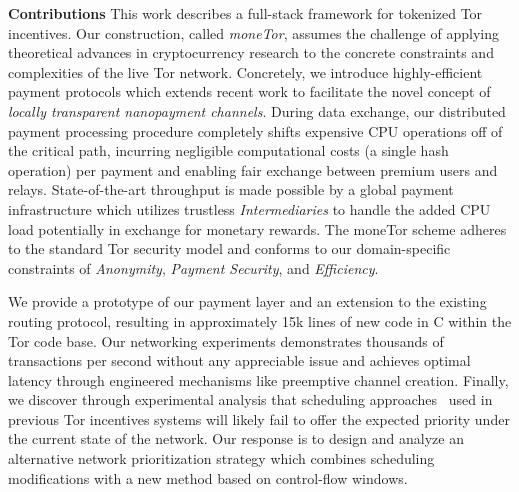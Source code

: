\label{sec:Contributions}
\textbf{Contributions} This work describes a full-stack framework for tokenized
Tor incentives. Our construction, called \emph{moneTor}, assumes the challenge
of applying theoretical advances in cryptocurrency research to the concrete
constraints and complexities of the live Tor network. Concretely, we introduce
highly-efficient payment protocols which extends recent work to facilitate the
novel concept of \emph{locally transparent nanopayment channels}. During data
exchange, our distributed payment processing procedure completely shifts
expensive CPU operations off of the critical path, incurring negligible
computational costs (a single hash operation) per payment and enabling fair
exchange between premium users and relays. State-of-the-art throughput is made
possible by a global payment infrastructure which utilizes trustless
\emph{Intermediaries} to handle the added CPU load potentially in exchange for
monetary rewards. The moneTor scheme adheres to the standard Tor security model
and conforms to our domain-specific constraints of \emph{Anonymity},
\emph{Payment Security}, and \emph{Efficiency}.

We provide a prototype of our payment layer and an extension to the existing
routing protocol, resulting in approximately 15k lines of new code in C within
the Tor code base. Our networking experiments demonstrates thousands of
transactions per second without any appreciable issue and achieves optimal
latency through engineered mechanisms like preemptive channel creation. Finally,
we discover through experimental analysis that scheduling
approaches~\cite{dovrolis1999case, tang2010improved} used in previous Tor
incentives systems will likely fail to offer the expected priority under the
current state of the network. Our response is to design and analyze an
alternative network prioritization strategy which combines scheduling
modifications with a new method based on control-flow windows.

